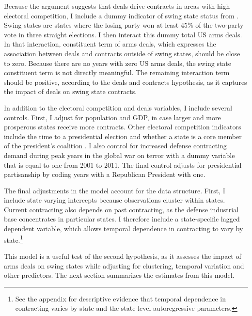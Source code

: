 \documentclass[12pt]{article}
\begin{document}
Because the argument suggests that deals drive contracts in areas with high electoral competition, I include a dummy indicator of swing state status from \citep{KrinerReeves2015}.
Swing states are states where the losing party won at least 45\% of the two-party vote in three straight elections. 
I then interact this dummy total US arms deals. 
In that interaction, constituent term of arms deals, which expresses the association between deals and contracts outside of swing states, should be close to zero.
Because there are no years with zero US arms deals, the swing state constituent term is not directly meaningful.  
The remaining interaction term should be positive, according to the deals and contracts hypothesis, as it captures the impact of deals on swing state contracts. 


In addition to the electoral competition and deals variables, I include several controls. 
First, I adjust for population and GDP, in case larger and more prosperous states receive more contracts. 
Other electoral competition indicators include the time to a presidential election and whether a state is a core member of the president's coalition \citep{KrinerReeves2015}. 
I also control for increased defense contracting demand during peak years in the global war on terror with a dummy variable that is equal to one from 2001 to 2011. 
The final control adjusts for presidential partisanship by coding years with a Republican President with one. 


The final adjustments in the model account for the data structure.
First, I include state varying intercepts because observations cluster within states. 
Current contracting also depends on past contracting, as the defense industrial base concentrates in particular states. 
I therefore include a state-specific lagged dependent variable, which allows temporal dependence in contracting to vary by state.\footnote{See the appendix for descriptive evidence that temporal dependence in contracting varies by state and the state-level autoregressive parameters.}




This model is a useful test of the second hypothesis, as it assesses the impact of arms deals on swing states while adjusting for clustering, temporal variation and other predictors.%
The next section summarizes the estimates from this model. 
\end{document}
